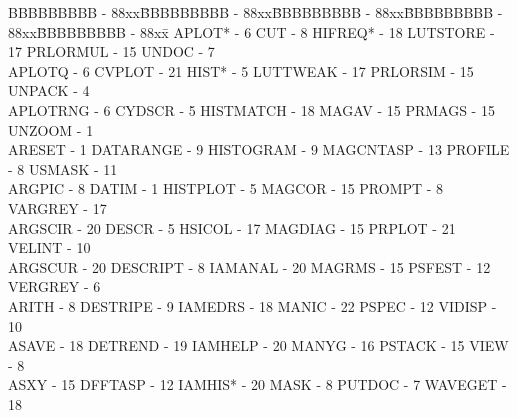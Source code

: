 {\begin{tabbing}
BBBBBBBBB - 88xx\=BBBBBBBBB - 88xx\=BBBBBBBBB - 88xx\=BBBBBBBBB - 88xx\=BBBBBBBBB - 88xx\=\kill
 APLOT* - 6                              \>CUT - 8
   \>HIFREQ* - 18                            \>
 LUTSTORE - 17                           \>PRLORMUL - 15
   \>UNDOC - 7                               \\
 APLOTQ - 6                              \>CVPLOT - 21
   \>HIST* - 5                               \>
 LUTTWEAK - 17                           \>PRLORSIM - 15
   \>UNPACK - 4                              \\
 APLOTRNG - 6                            \>CYDSCR - 5
   \>HISTMATCH - 18                          \>
 MAGAV - 15                              \>PRMAGS - 15
   \>UNZOOM - 1                              \\
 ARESET - 1                              \>DATARANGE - 9
   \>HISTOGRAM - 9                           \>
 MAGCNTASP - 13                          \>PROFILE - 8
   \>USMASK - 11                             \\
 ARGPIC - 8                              \>DATIM - 1
   \>HISTPLOT - 5                            \>
 MAGCOR - 15                             \>PROMPT - 8
   \>VARGREY - 17                            \\
 ARGSCIR - 20                            \>DESCR - 5
   \>HSICOL - 17                             \>
 MAGDIAG - 15                            \>PRPLOT - 21
   \>VELINT - 10                             \\
 ARGSCUR - 20                            \>DESCRIPT - 8
   \>IAMANAL - 20                            \>
 MAGRMS - 15                             \>PSFEST - 12
   \>VERGREY - 6                             \\
 ARITH - 8                               \>DESTRIPE - 9
   \>IAMEDRS - 18                            \>
 MANIC - 22                              \>PSPEC - 12
   \>VIDISP - 10                             \\
 ASAVE - 18                              \>DETREND - 19
   \>IAMHELP - 20                            \>
 MANYG - 16                              \>PSTACK - 15
   \>VIEW - 8                                \\
 ASXY - 15                               \>DFFTASP - 12
   \>IAMHIS* - 20                            \>
 MASK - 8                                \>PUTDOC - 7
   \>WAVEGET - 18                            \\

\end{tabbing}}
